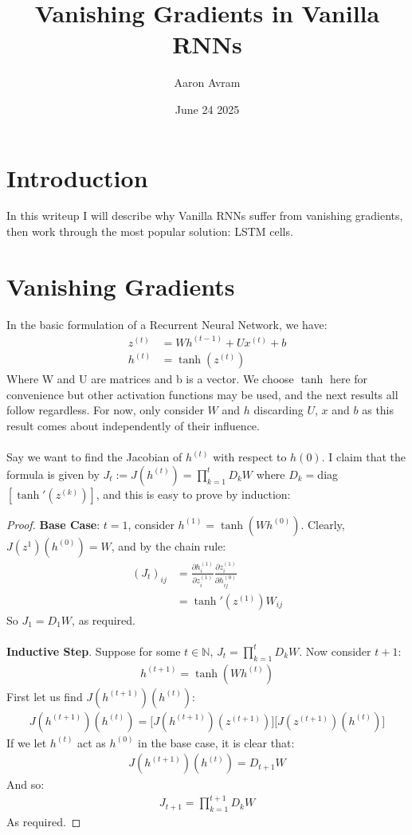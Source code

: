 \documentclass[12pt]{article}
\title{Vanishing Gradients in Vanilla RNNs}
\author{Aaron Avram}
\date{June 24 2025}
\begin{document}
\maketitle

\section*{Introduction}
In this writeup I will describe why Vanilla RNNs suffer from vanishing gradients, then work through
the most popular solution: LSTM cells.

\section*{Vanishing Gradients}
In the basic formulation of a Recurrent Neural Network, we have:
\begin{align*}
    z^{(t)} &= Wh^{(t-1)} + Ux^{(t)} + b \\
    h^{(t)} &= \tanh(z^{(t)})
\end{align*}
Where W and U are matrices and b is a vector. We choose $\tanh$ here for convenience
but other activation functions may be used, and the next results all follow regardless. For now,
only consider $W$ and $h$ discarding $U$, $x$ and $b$ as this result comes about independently of their influence.
\\ \\
Say we want to find the Jacobian of $h^{(t)}$ with respect to $h{(0)}$. I claim that the formula is
given by $J_t := J(h^{(t)}) = \prod_{k = 1}^{t}D_kW$ where $D_k = $diag$[\tanh'(z^{(k)})]$, and this is easy
to prove by induction:
\begin{proof}
    \textbf{Base Case}: $t = 1$, consider $h^{(1)} = \tanh(Wh^{(0)})$. Clearly, $J(z^{1})(h^{(0)}) = W$,
    and by the chain rule:
    \begin{align*}
        (J_t)_{ij} &= \frac{\partial h^{(1)}_i}{\partial z^{(1)}_i} \frac{\partial z^{(1)}_i}{\partial h^{(0)}_{ij}} \\
        &= \tanh'(z^{(1)}) W_{ij}
    \end{align*}
    So $J_1 = D_1W$, as required.
    \\ \\
    \textbf{Inductive Step}. Suppose for some $t \in \mathbb{N}$, $J_t = \prod_{k = 1}^{t}D_kW$. Now consider $t + 1$:
    \begin{align*}
        h^{(t+1)} = \tanh(Wh^{(t)})
    \end{align*}
    First let us find $J(h^{(t+1)})(h^{(t)})$:
    \begin{align*}
        J(h^{(t+1)})(h^{(t)}) = \Big[J(h^{(t+1)})(z^{(t+1)})\Big]\Big[J(z^{(t+1)})(h^{(t)})\Big]
    \end{align*}
    If we let $h^{(t)}$ act as $h^{(0)}$ in the base case, it is clear that:
    \begin{align*}
        J(h^{(t+1)})(h^{(t)}) = D_{t+1}W
    \end{align*}
    And so:
    \begin{align*}
        J_{t+1} = \prod_{k=1}^{t+1}D_kW
    \end{align*}
    As required.
\end{proof}
\end{document}

